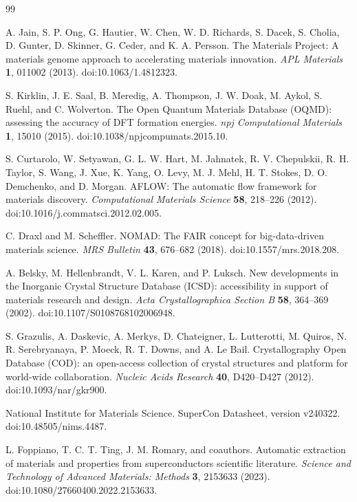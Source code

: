 \documentclass[11pt,a4paper]{article}
\begin{document}
\begin{thebibliography}{99}

A. Jain, S. P. Ong, G. Hautier, W. Chen, W. D. Richards, S. Dacek, S. Cholia, D. Gunter, D. Skinner, G. Ceder, and K. A. Persson.
The Materials Project: A materials genome approach to accelerating materials innovation.
\textit{APL Materials} \textbf{1}, 011002 (2013).
doi:10.1063/1.4812323.

S. Kirklin, J. E. Saal, B. Meredig, A. Thompson, J. W. Doak, M. Aykol, S. Ruehl, and C. Wolverton.
The Open Quantum Materials Database (OQMD): assessing the accuracy of DFT formation energies.
\textit{npj Computational Materials} \textbf{1}, 15010 (2015).
doi:10.1038/npjcompumats.2015.10.

S. Curtarolo, W. Setyawan, G. L. W. Hart, M. Jahnatek, R. V. Chepulskii, R. H. Taylor, S. Wang, J. Xue, K. Yang, O. Levy, M. J. Mehl, H. T. Stokes, D. O. Demchenko, and D. Morgan.
AFLOW: The automatic flow framework for materials discovery.
\textit{Computational Materials Science} \textbf{58}, 218--226 (2012).
doi:10.1016/j.commatsci.2012.02.005.

C. Draxl and M. Scheffler.
NOMAD: The FAIR concept for big-data-driven materials science.
\textit{MRS Bulletin} \textbf{43}, 676--682 (2018).
doi:10.1557/mrs.2018.208.

A. Belsky, M. Hellenbrandt, V. L. Karen, and P. Luksch.
New developments in the Inorganic Crystal Structure Database (ICSD): accessibility in support of materials research and design.
\textit{Acta Crystallographica Section B} \textbf{58}, 364--369 (2002).
doi:10.1107/S0108768102006948.

S. Grazulis, A. Daskevic, A. Merkys, D. Chateigner, L. Lutterotti, M. Quiros, N. R. Serebryanaya, P. Moeck, R. T. Downs, and A. Le Bail.
Crystallography Open Database (COD): an open-access collection of crystal structures and platform for world-wide collaboration.
\textit{Nucleic Acids Research} \textbf{40}, D420--D427 (2012).
doi:10.1093/nar/gkr900.

National Institute for Materials Science.
SuperCon Datasheet, version v240322.
doi:10.48505/nims.4487.

L. Foppiano, T. C. T. Ting, J. M. Romary, and coauthors.
Automatic extraction of materials and properties from superconductors scientific literature.
\textit{Science and Technology of Advanced Materials: Methods} \textbf{3}, 2153633 (2023).
doi:10.1080/27660400.2022.2153633.


\end{thebibliography}
\end{document}
